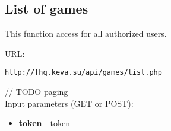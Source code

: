 \subsection{List of games}
\par

This function access for all authorized users.

URL:
\begin{Verbatim}[frame=single]
http://fhq.keva.su/api/games/list.php
\end{Verbatim}

// TODO paging \\
Input parameters (GET or POST):
\begin{itemize}
  \item \textbf{token} - token  
\end{itemize}

